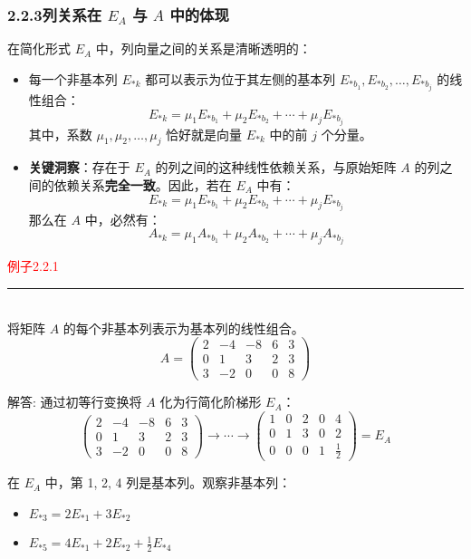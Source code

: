 \documentclass[10pt, a4paper]{article}
\begin{document}
\subsubsection*{2.2.3列关系在 \( E_A \) 与 \( A \) 中的体现}

在简化形式 \( E_A \) 中，列向量之间的关系是清晰透明的：
\begin{itemize}
    \item 每一个非基本列 \( E_{*k} \) 都可以表示为位于其左侧的基本列 \( E_{*b_1}, E_{*b_2}, \dots, E_{*b_j} \) 的线性组合：
    \[
    E_{*k} = \mu_1 E_{*b_1} + \mu_2 E_{*b_2} + \cdots + \mu_j E_{*b_j}
    \]
    其中，系数 \( \mu_1, \mu_2, \dots, \mu_j \) 恰好就是向量 \( E_{*k} \) 中的前 \( j \) 个分量。
    
    \item \textbf{关键洞察}：存在于 \( E_A \) 的列之间的这种线性依赖关系，与原始矩阵 \( A \) 的列之间的依赖关系\textbf{完全一致}。因此，若在 \( E_A \) 中有：
    \[
    E_{*k} = \mu_1 E_{*b_1} + \mu_2 E_{*b_2} + \cdots + \mu_j E_{*b_j}
    \]
    那么在 \( A \) 中，必然有：
    \[
    A_{*k} = \mu_1 A_{*b_1} + \mu_2 A_{*b_2} + \cdots + \mu_j A_{*b_j}
    \]
\end{itemize}

\textcolor{red}{例子2.2.1}
\color{red}\rule{\textwidth}{0.4pt}\color{black}\\
将矩阵 \( A \) 的每个非基本列表示为基本列的线性组合。
\[
A = \begin{pmatrix}
2 & -4 & -8 & 6 & 3 \\
0 & 1 & 3 & 2 & 3 \\
3 & -2 & 0 & 0 & 8
\end{pmatrix}
\]

解答:
通过初等行变换将 \( A \) 化为行简化阶梯形 \( E_A \)：
\[
\begin{pmatrix}
2 & -4 & -8 & 6 & 3 \\
0 & 1 & 3 & 2 & 3 \\
3 & -2 & 0 & 0 & 8
\end{pmatrix}
\rightarrow \cdots \rightarrow
\begin{pmatrix}
1 & 0 & 2 & 0 & 4 \\
0 & 1 & 3 & 0 & 2 \\
0 & 0 & 0 & 1 & \frac{1}{2}
\end{pmatrix} = E_A
\]

在 \( E_A \) 中，第 1, 2, 4 列是基本列。观察非基本列：
\begin{itemize}
    \item \( E_{*3} = 2E_{*1} + 3E_{*2} \)
    \item \( E_{*5} = 4E_{*1} + 2E_{*2} + \frac{1}{2}E_{*4} \)
\end{itemize}
\end{document}
